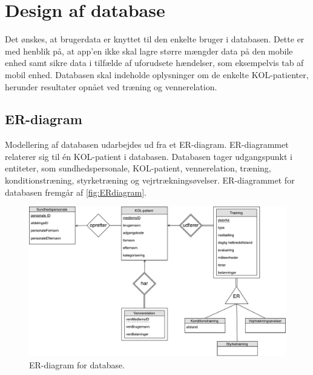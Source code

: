 \section{Design af database}
Det ønskes, at brugerdata er knyttet til den enkelte bruger i databasen. Dette er med henblik på, at app'en ikke skal lagre større mængder data på den mobile enhed samt sikre data i tilfælde af uforudsete hændelser, som eksempelvis tab af mobil enhed. Databasen skal indeholde oplysninger om de enkelte KOL-patienter, herunder resultater opnået ved træning og vennerelation. 

\subsection{ER-diagram}
Modellering af databasen udarbejdes ud fra et ER-diagram. ER-diagrammet relaterer sig til én KOL-patient i databasen. Databasen tager udgangspunkt i entiteter, som sundhedspersonale, KOL-patient, vennerelation, træning, konditionstræning, styrketræning og vejrtrækningsøvelser. ER-diagrammet for databasen fremgår af \autoref{fig:ERdiagram}.


\begin{figure} [H]
\centering
\includegraphics[width=1\textwidth]{figures/Aktivitetsdiagram/ERdiagram}
\caption{ER-diagram for database.}
\label{fig:ERdiagram}
\end{figure} 


